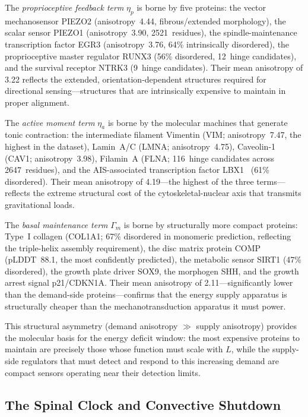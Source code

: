 \documentclass[11pt,a4paper]{article}
\begin{document}
The \emph{proprioceptive feedback term} $\eta_p$ is borne by five proteins: the vector mechanosensor PIEZO2 (anisotropy~4.44, fibrous/extended morphology), the scalar sensor PIEZO1 (anisotropy~3.90, 2521~residues), the spindle-maintenance transcription factor EGR3 (anisotropy~3.76, 64\% intrinsically disordered), the proprioceptive master regulator RUNX3 (56\% disordered, 12~hinge candidates), and the survival receptor NTRK3 (9~hinge candidates). Their mean anisotropy of 3.22 reflects the extended, orientation-dependent structures required for directional sensing---structures that are intrinsically expensive to maintain in proper alignment.

The \emph{active moment term} $\eta_a$ is borne by the molecular machines that generate tonic contraction: the intermediate filament Vimentin (VIM; anisotropy~7.47, the highest in the dataset), Lamin~A/C (LMNA; anisotropy~4.75), Caveolin-1 (CAV1; anisotropy~3.98), Filamin~A (FLNA; 116~hinge candidates across 2647~residues), and the AIS-associated transcription factor LBX1~\cite{kou2013lbx1} (61\% disordered). Their mean anisotropy of 4.19---the highest of the three terms---reflects the extreme structural cost of the cytoskeletal-nuclear axis that transmits gravitational loads.

The \emph{basal maintenance term} $\Gamma_m$ is borne by structurally more compact proteins: Type~I collagen (COL1A1; 67\% disordered in monomeric prediction, reflecting the triple-helix assembly requirement), the disc matrix protein COMP (pLDDT~88.1, the most confidently predicted), the metabolic sensor SIRT1 (47\% disordered), the growth plate driver SOX9, the morphogen SHH, and the growth arrest signal p21/CDKN1A. Their mean anisotropy of 2.11---significantly lower than the demand-side proteins---confirms that the energy supply apparatus is structurally cheaper than the mechanotransduction apparatus it must power.

This structural asymmetry (demand anisotropy $\gg$ supply anisotropy) provides the molecular basis for the energy deficit window: the most expensive proteins to maintain are precisely those whose function must scale with $L$, while the supply-side regulators that must detect and respond to this increasing demand are compact sensors operating near their detection limits.

\subsection{The Spinal Clock and Convective Shutdown}
\end{document}
